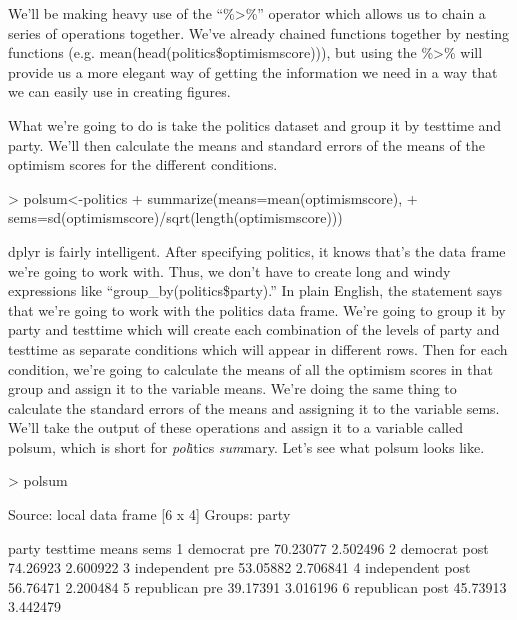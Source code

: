 \documentclass[12pt]{article}
\begin{document}
We'll be making heavy use of the ``\%>\%'' operator which allows us to chain a series
of operations together. We've already chained functions together by nesting functions
(e.g. mean(head(politics\$optimismscore))), but using the \%>\% will provide us a more
elegant way of getting the information we need in a way that we can easily use in creating
figures.

What we're going to do is take the politics dataset and group it by testtime and party.
We'll then calculate the means and standard errors of the means of the optimism scores
for the different conditions.


\begin{Schunk}
\begin{Sinput}
> polsum<-politics%
+     summarize(means=mean(optimismscore),
+               sems=sd(optimismscore)/sqrt(length(optimismscore)))
\end{Sinput}
\end{Schunk}

dplyr is fairly intelligent. After specifying politics, it knows that's the data frame
we're going to work with. Thus, we don't have to create long and windy expressions like
``group\_by(politics\$party).'' In plain English, the statement says that we're going to
work with the politics data
frame. We're going to group it by party and testtime which will create each combination
of the levels of party and testtime as separate conditions which will appear in different
rows. Then for each condition, we're going to calculate the means of all the optimism
scores in that group and assign it to the variable means. We're doing the same thing
to calculate the standard errors of the means and assigning it to the variable sems.
We'll take the output of these operations and assign it to a variable called polsum,
which is short for \emph{pol}itics \emph{sum}mary. Let's see what polsum looks like.

\begin{Schunk}
\begin{Sinput}
> polsum
\end{Sinput}
\begin{Soutput}
Source: local data frame [6 x 4]
Groups: party

        party testtime    means     sems
1    democrat      pre 70.23077 2.502496
2    democrat     post 74.26923 2.600922
3 independent      pre 53.05882 2.706841
4 independent     post 56.76471 2.200484
5  republican      pre 39.17391 3.016196
6  republican     post 45.73913 3.442479
\end{Soutput}
\end{Schunk}
\end{document}
